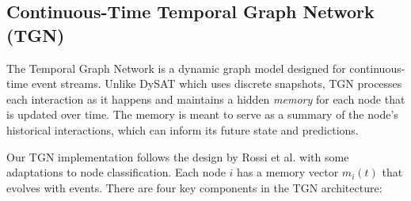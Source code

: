 \documentclass{cshonours}
\begin{document}
\subsection{Continuous-Time Temporal Graph Network (TGN)}

The Temporal Graph Network is a dynamic graph model designed for continuous-time event streams. Unlike DySAT which uses discrete snapshots, TGN processes each interaction as it happens and maintains a hidden \emph{memory} for each node that is updated over time. The memory is meant to serve as a summary of the node's historical interactions, which can inform its future state and predictions.

Our TGN implementation follows the design by Rossi et al. \cite{rossi2020tgn} with some adaptations to node classification. Each node $i$ has a memory vector $m_i(t)$ that evolves with events. There are four key components in the TGN architecture:
\end{document}
